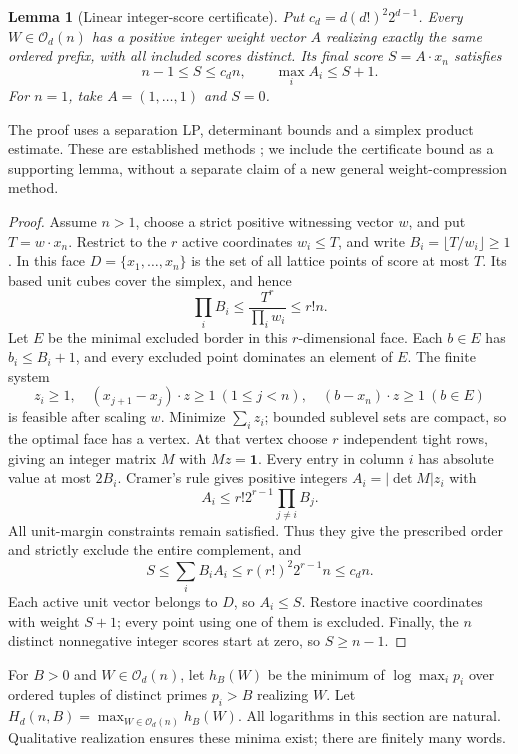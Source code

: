 \documentclass[11pt,a4paper]{article}
\newtheorem{lemma}[theorem]{Lemma}
\theoremstyle{remark}
\newcommand{\floor}[1]{\lfloor#1\rfloor}
\begin{document}
\begin{lemma}[Linear integer-score certificate]\label{lem:linear-score}
Put \(c_d=d(d!)^2 2^{d-1}\). Every \(W\in\mathcal O_d(n)\) has a
positive integer weight vector \(A\) realizing exactly the same ordered
prefix, with all included scores distinct. Its final score \(S=A\cdot x_n\)
satisfies
\[
 n-1\leq S\leq c_dn,\qquad
 \max_iA_i\leq S+1.                         \tag{15}\label{eq:linear-score}
\]
For \(n=1\), take \(A=(1,\ldots,1)\) and \(S=0\).
\end{lemma}
The proof uses a separation LP, determinant bounds and a simplex product
estimate. These are established methods \cite{OS,W02}; we include the
certificate bound as a supporting lemma, without a separate claim of a
new general weight-compression method.
\begin{proof}
Assume \(n>1\), choose a strict positive witnessing vector \(w\), and
put \(T=w\cdot x_n\). Restrict to the \(r\) active coordinates
\(w_i\leq T\), and write \(B_i=\floor{T/w_i}\geq1\).
In this face \(D=\{x_1,\ldots,x_n\}\) is the set of all lattice
points of score at most \(T\). Its based unit cubes cover the simplex,
and hence
\[
 \prod_iB_i\leq\frac{T^r}{\prod_iw_i}\leq r!n.
\]
Let \(E\) be the minimal excluded border in this \(r\)-dimensional
face. Each \(b\in E\) has \(b_i\leq B_i+1\), and every excluded
point dominates an element of \(E\). The finite system
\[
 z_i\geq1,\quad (x_{j+1}-x_j)\cdot z\geq1\ (1\leq j<n),
 \quad (b-x_n)\cdot z\geq1\ (b\in E)
\]
is feasible after scaling \(w\). Minimize \(\sum_i z_i\);
bounded sublevel sets are compact, so the optimal face has a vertex.
At that vertex choose \(r\) independent tight rows, giving an integer
matrix \(M\) with \(Mz=\boldsymbol1\).
Every entry in column \(i\) has absolute value at most \(2B_i\).
Cramer's rule gives positive integers \(A_i=\lvert\det M\rvert z_i\)
with
\[
 A_i\leq r!2^{r-1}\prod_{j\ne i}B_j.
\]
All unit-margin constraints remain satisfied. Thus they give the
prescribed order and strictly exclude the entire complement, and
\[
 S\leq\sum_i B_iA_i
 \leq r(r!)^2 2^{r-1}n\leq c_dn.
\]
Each active unit vector belongs to \(D\), so \(A_i\leq S\).
Restore inactive coordinates with weight \(S+1\); every point using
one of them is excluded. Finally, the \(n\) distinct nonnegative
integer scores start at zero, so \(S\geq n-1\).
\end{proof}

For \(B>0\) and \(W\in\mathcal O_d(n)\), let \(h_B(W)\) be the
minimum of \(\log\max_i p_i\) over ordered tuples of distinct primes
\(p_i>B\) realizing \(W\). Let
\(H_d(n,B)=\max_{W\in\mathcal O_d(n)}h_B(W)\).
All logarithms in this section are natural. Qualitative realization
ensures these minima exist; there are finitely many words.
\end{document}
